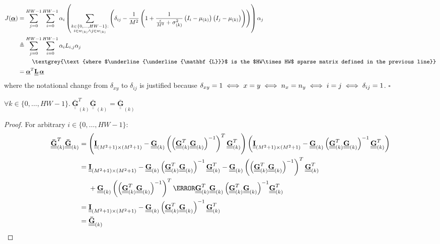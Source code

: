 \documentclass{article}
\def\vts#1{\underline{\boldsymbol{#1}}}
\def\mt#1{\underline{\underline{\mathbf{#1}}}}
\begin{document}
\begin{align*}
    J(\vts\alpha) &= \sum_{j=0}^{HW-1} \sum_{i=0}^{HW-1} \alpha_i \left(\sum_{\substack{k\in\{0,\dots,HW-1\}:\\i\in w_{(k)}\wedge j\in w_{(k)}}} \left( \delta_{ij} - \frac1{M^2}\left(1 + \frac1{\frac\epsilon{M^2} + \sigma_{(k)}^2} \left({I}_{i} - \mu_{(k)}\right) \left({I}_{j} - \mu_{(k)}\right) \right) \right)\right) \alpha_j\\
    &\triangleq \sum_{j=0}^{HW-1} \sum_{i=0}^{HW-1} \alpha_i L_{i,j} \alpha_j\\
    &\quad\quad\ \textgrey{\text{where $\mt L$ is the $HW\times HW$ sparse matrix defined in the previous line}}\\
    &= \vts \alpha^T \mt L\, \vts \alpha
\end{align*}
where the notational change from $\delta_{xy}$ to $\delta_{ij}$ is justified because $\delta_{xy} = 1 \iff x=y \iff n_x = n_y \iff i = j\\ \iff \delta_{ij}=1$. \hfill$\square$


\begin{lemma}\label{lemma1}
    $\forall k\in\{0,\dots,HW-1\}.\ \mt{\bar{G}}_{(k)}^T \mt{\bar{G}}_{(k)} = \mt{\bar{G}}_{(k)}$
    \begin{proof}
        For arbitrary $i\in\{0,\dots,HW-1\}$:
        \begin{align*}
            \mt{\bar{G}}_{(k)}^T \mt{\bar{G}}_{(k)} &= \left(\mt I_{(M^2+1)\times(M^2+1)} -  \mt G_{(k)} \left(\left(\mt G_{(k)}^T \mt G_{(k)} \right)^{-1}\right)^T \mt G_{(k)}^T \right) \left(\mt I_{(M^2+1)\times(M^2+1)} -  \mt G_{(k)}\left(\mt G_{(k)}^T \mt G_{(k)} \right)^{-1} \mt G_{(k)}^T \right)\\
            &= \mt I_{(M^2+1)\times(M^2+1)} - \mt G_{(k)}\left(\mt G_{(k)}^T \mt G_{(k)} \right)^{-1} \mt G_{(k)}^T - \mt G_{(k)} \left(\left(\mt G_{(k)}^T \mt G_{(k)} \right)^{-1}\right)^T \mt G_{(k)}^T \\
            &\quad\ + \mt G_{(k)} \left(\left(\mt G_{(k)}^T \mt G_{(k)} \right)^{-1}\right)^T \cancel{\mt G_{(k)}^T \mt G_{(k)}\left(\mt G_{(k)}^T \mt G_{(k)} \right)^{-1}} \mt G_{(k)}^T \\
            &= \mt I_{(M^2+1)\times(M^2+1)} - \mt G_{(k)}\left(\mt G_{(k)}^T \mt G_{(k)} \right)^{-1} \mt G_{(k)}^T \\
            &= \mt{\bar{G}}_{(k)}
        \end{align*}
    \end{proof}
\end{lemma}
\end{document}
